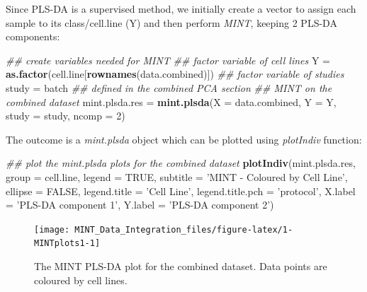 \documentclass[]{book}
\newenvironment{Shaded}{\begin{snugshade}}{\end{snugshade}}
\newcommand{\CommentTok}[1]{\textcolor[rgb]{0.56,0.35,0.01}{\textit{#1}}}
\newcommand{\DataTypeTok}[1]{\textcolor[rgb]{0.13,0.29,0.53}{#1}}
\newcommand{\DecValTok}[1]{\textcolor[rgb]{0.00,0.00,0.81}{#1}}
\newcommand{\KeywordTok}[1]{\textcolor[rgb]{0.13,0.29,0.53}{\textbf{#1}}}
\newcommand{\NormalTok}[1]{#1}
\newcommand{\OtherTok}[1]{\textcolor[rgb]{0.56,0.35,0.01}{#1}}
\newcommand{\StringTok}[1]{\textcolor[rgb]{0.31,0.60,0.02}{#1}}
\theoremstyle{definition}
\theoremstyle{definition}
\theoremstyle{definition}
\theoremstyle{remark}
\begin{document}
Since PLS-DA is a supervised method, we initially create a vector to
assign each sample to its class/cell.line (Y) and then perform
\emph{MINT}, keeping 2 PLS-DA components:

\begin{Shaded}
\begin{Highlighting}[]
\CommentTok{## create variables needed for MINT}
\CommentTok{## factor variable of cell lines}
\NormalTok{Y =}\StringTok{ }\KeywordTok{as.factor}\NormalTok{(cell.line[}\KeywordTok{rownames}\NormalTok{(data.combined)])}
\CommentTok{## factor variable of studies}
\NormalTok{study =}\StringTok{ }\NormalTok{batch }\CommentTok{## defined in the combined PCA section}
\CommentTok{## MINT on the combined dataset}
\NormalTok{mint.plsda.res =}\StringTok{ }\KeywordTok{mint.plsda}\NormalTok{(}\DataTypeTok{X =}\NormalTok{ data.combined, }\DataTypeTok{Y =}\NormalTok{ Y,}
                             \DataTypeTok{study =}\NormalTok{ study, }\DataTypeTok{ncomp =} \DecValTok{2}\NormalTok{)}
\end{Highlighting}
\end{Shaded}

The outcome is a \emph{mint.plsda} object which can be plotted using
\emph{plotIndiv} function:

\begin{Shaded}
\begin{Highlighting}[]
\CommentTok{## plot the mint.plsda plots for the combined dataset}
\KeywordTok{plotIndiv}\NormalTok{(mint.plsda.res, }\DataTypeTok{group =}\NormalTok{ cell.line,}
          \DataTypeTok{legend  =} \OtherTok{TRUE}\NormalTok{, }\DataTypeTok{subtitle     =} \StringTok{'MINT - Coloured by Cell Line'}\NormalTok{,}
          \DataTypeTok{ellipse =} \OtherTok{FALSE}\NormalTok{, }\DataTypeTok{legend.title =} \StringTok{'Cell Line'}\NormalTok{,}
          \DataTypeTok{legend.title.pch =} \StringTok{'protocol'}\NormalTok{,}
          \DataTypeTok{X.label =} \StringTok{'PLS-DA component 1'}\NormalTok{,}
          \DataTypeTok{Y.label =} \StringTok{'PLS-DA component 2'}\NormalTok{)}
\end{Highlighting}
\end{Shaded}

\begin{figure}[ht]

{\centering \texttt{[image: MINT\_Data\_Integration\_files/figure-latex/1-MINTplots1-1]} 

}

\caption{The MINT PLS-DA plot for the combined dataset. Data points are coloured by cell lines.}\label{fig:1-MINTplots1}
\end{figure}
\end{document}
